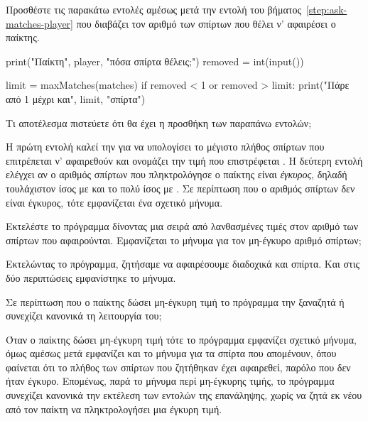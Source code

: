 \documentclass[a4paper,11pt,oneside]{book}
\begin{document}
\begin{step}
\label{step:check-matches}
Προσθέστε τις παρακάτω εντολές αμέσως μετά την εντολή του βήματος~\ref{step:ask-matches-player} που διαβάζει τον αριθμό των σπίρτων που θέλει ν' αφαιρέσει ο παίκτης.

\begin{pyplain}
    print("Παίκτη", player, "πόσα σπίρτα θέλεις;")
    removed = int(input())
\end{pyplain}
\begin{pynew}
    limit = maxMatches(matches)
    if removed < 1 or removed > limit:
        print("Πάρε από 1 μέχρι και", limit, "σπίρτα") 
\end{pynew}

Τι αποτέλεσμα πιστεύετε ότι θα έχει η προσθήκη των παραπάνω εντολών; 

\begin{answer}
Η πρώτη εντολή καλεί την  για να υπολογίσει το μέγιστο πλήθος σπίρτων που επιτρέπεται ν' αφαιρεθούν και ονομάζει την τιμή που επιστρέφεται . Η δεύτερη εντολή ελέγχει αν ο αριθμός σπίρτων που πληκτρολόγησε ο παίκτης είναι \emph{έγκυρος}, δηλαδή τουλάχιστον ίσος με  και το πολύ ίσος με . Σε περίπτωση που ο αριθμός σπίρτων δεν είναι έγκυρος, τότε εμφανίζεται ένα σχετικό μήνυμα.
\end{answer}

Εκτελέστε το πρόγραμμα δίνοντας μια σειρά από λανθασμένες τιμές στον αριθμό των σπίρτων που αφαιρούνται. Εμφανίζεται το μήνυμα για τον μη-έγκυρο αριθμό σπίρτων;

\begin{answer}
Εκτελώντας το πρόγραμμα, ζητήσαμε να αφαιρέσουμε διαδοχικά  και  σπίρτα. Και στις δύο περιπτώσεις εμφανίστηκε το μήνυμα. 
\end{answer}

Σε περίπτωση που ο παίκτης δώσει μη-έγκυρη τιμή το πρόγραμμα την ξαναζητά ή συνεχίζει κανονικά τη λειτουργία του;

\begin{answer}
Όταν ο παίκτης δώσει μη-έγκυρη τιμή τότε το πρόγραμμα εμφανίζει σχετικό μήνυμα, όμως αμέσως μετά εμφανίζει και το μήνυμα για τα σπίρτα που απομένουν, όπου φαίνεται ότι το πλήθος των σπίρτων που ζητήθηκαν έχει αφαιρεθεί, παρόλο που δεν ήταν έγκυρο. Επομένως, παρά το μήνυμα περί μη-έγκυρης τιμής, το πρόγραμμα συνεχίζει κανονικά την εκτέλεση των εντολών της επανάληψης, χωρίς να ζητά εκ νέου από τον παίκτη να πληκτρολογήσει μια έγκυρη τιμή. 
\end{answer}


\end{step}
\end{document}
